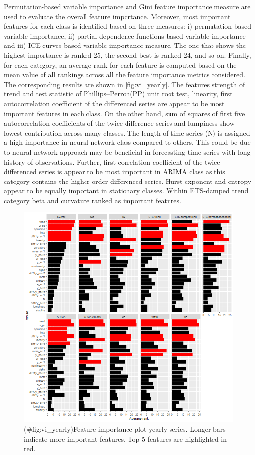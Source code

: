 \documentclass[11pt,a4paper,]{article}
\theoremstyle{definition}
\theoremstyle{definition}
\theoremstyle{definition}
\theoremstyle{remark}
\begin{document}
Permutation-based variable importance and Gini feature importance
measure are used to evaluate the overall feature importance. Moreover,
most important features for each class is identified based on three
measures: i) permutation-based variable importance, ii) partial
dependence functions based variable importance and iii) ICE-curves based
variable importance measure. The one that shows the highest importance
is ranked 25, the second best is ranked 24, and so on. Finally, for each
category, an average rank for each feature is computed based on the mean
value of all rankings across all the feature importance metrics
considered. The corresponding results are shown in
\autoref{fig:vi_yearly}. The features strength of trend and test
statistic of Phillips--Perron(PP) unit root test, linearity, first
autocorrelation coefficient of the differenced series are appear to be
most important features in each class. On the other hand, sum of squares
of first five autocorrelation coefficients of the twice-difference
series and lumpiness show lowest contribution across many classes. The
length of time series (N) is assigned a high importance in
neural-network class compared to others. This could be due to neural
network approach may be beneficial in forecasting time series with long
history of observations. Further, first correlation coefficient of the
twice-differenced series is appear to be most important in ARIMA class
as this category contains the higher order differenced series. Hurst
exponent and entropy appear to be equally important in stationary
classes. Within ETS-damped trend category beta and curvature ranked as
important features.

\begin{figure}
\centering
\includegraphics{figures/vi_yearly-1.png}
\caption{(\#fig:vi\_yearly)Feature importance plot yearly series. Longer
bars indicate more important features. Top 5 features are highlighted in
red.}
\end{figure}
\end{document}

